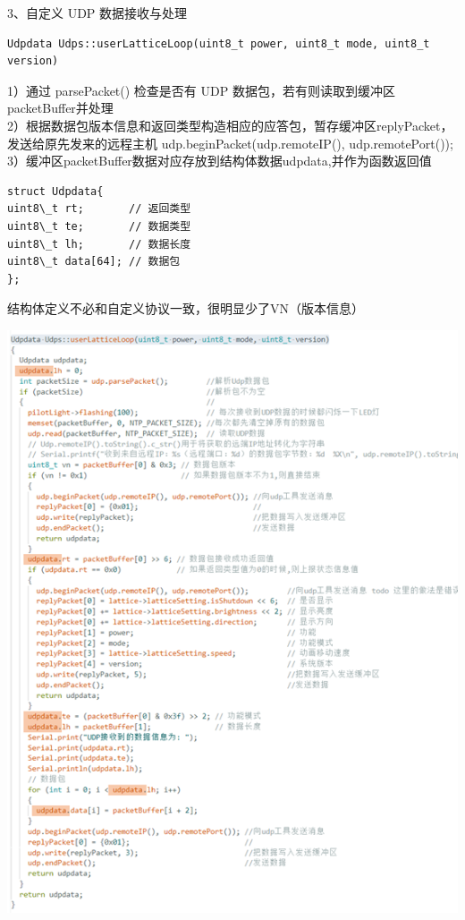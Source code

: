 \documentclass[16pt]{beamer}	%
\begin{document}
	   \begin{frame}[fragile]
	 	3、自定义 UDP 数据接收与处理
\begin{lstlisting}
Udpdata Udps::userLatticeLoop(uint8_t power, uint8_t mode, uint8_t version)
\end{lstlisting}
\small 1）通过 parsePacket() 检查是否有 UDP 数据包，若有则读取到缓冲区packetBuffer并处理
\\2）根据数据包版本信息和返回类型构造相应的应答包，暂存缓冲区replyPacket，发送给原先发来的远程主机 udp.beginPacket(udp.remoteIP(), udp.remotePort()); 
\\3）缓冲区packetBuffer数据对应存放到结构体数据udpdata,并作为函数返回值
\begin{lstlisting}
struct Udpdata{
uint8\_t rt;       // 返回类型
uint8\_t te;       // 数据类型
uint8\_t lh;       // 数据长度
uint8\_t data[64]; // 数据包
};
\end{lstlisting}
\small 结构体定义不必和自定义协议一致，很明显少了VN（版本信息）
	 \end{frame}
	 \begin{frame}
		\centering \includegraphics[height=\paperheight]{pic/2-5.png} 
	 \end{frame}
\end{document}
